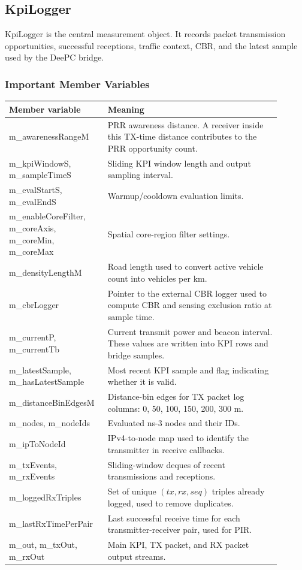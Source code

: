 \documentclass[11pt]{article}
\DeclareRobustCommand{\code}[1]{\texttt{\detokenize{#1}}}
\def\code#1{#1}%
\begin{document}
\subsection{\code{KpiLogger}}

\code{KpiLogger} is the central measurement object.  It records packet
transmission opportunities, successful receptions, traffic context, CBR, and the
latest sample used by the DeePC bridge.

\subsubsection{Important Member Variables}

\begin{center}
\begin{longtable}{L{0.30\linewidth}L{0.60\linewidth}}
\toprule
Member variable & Meaning \\
\midrule
\endhead
\code{m_awarenessRangeM} &
PRR awareness distance.  A receiver inside this TX-time distance contributes to
the PRR opportunity count. \\
\code{m_kpiWindowS}, \code{m_sampleTimeS} &
Sliding KPI window length and output sampling interval. \\
\code{m_evalStartS}, \code{m_evalEndS} &
Warmup/cooldown evaluation limits. \\
\code{m_enableCoreFilter}, \code{m_coreAxis}, \code{m_coreMin}, \code{m_coreMax} &
Spatial core-region filter settings. \\
\code{m_densityLengthM} &
Road length used to convert active vehicle count into vehicles per km. \\
\code{m_cbrLogger} &
Pointer to the external CBR logger used to compute CBR and sensing exclusion
ratio at sample time. \\
\code{m_currentP}, \code{m_currentTb} &
Current transmit power and beacon interval.  These values are written into KPI
rows and bridge samples. \\
\code{m_latestSample}, \code{m_hasLatestSample} &
Most recent KPI sample and flag indicating whether it is valid. \\
\code{m_distanceBinEdgesM} &
Distance-bin edges for TX packet log columns: 0, 50, 100, 150, 200, 300 m. \\
\code{m_nodes}, \code{m_nodeIds} &
Evaluated ns-3 nodes and their IDs. \\
\code{m_ipToNodeId} &
IPv4-to-node map used to identify the transmitter in receive callbacks. \\
\code{m_txEvents}, \code{m_rxEvents} &
Sliding-window deques of recent transmissions and receptions. \\
\code{m_loggedRxTriples} &
Set of unique \((tx,rx,seq)\) triples already logged, used to remove duplicates. \\
\code{m_lastRxTimePerPair} &
Last successful receive time for each transmitter-receiver pair, used for PIR. \\
\code{m_out}, \code{m_txOut}, \code{m_rxOut} &
Main KPI, TX packet, and RX packet output streams. \\
\bottomrule
\end{longtable}
\end{center}
\end{document}
